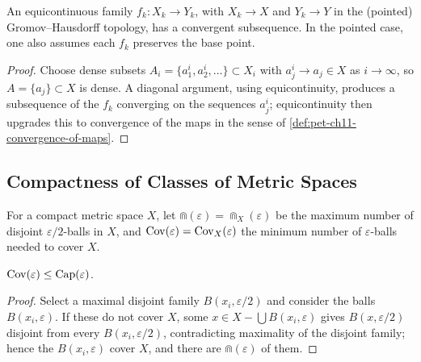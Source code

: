\begin{lemma}
  \label{lem:pet-ch11-arzela-ascoli-gh}
  An equicontinuous family $f_k:X_k\to Y_k$, with $X_k\to X$ and $Y_k\to Y$
  in the (pointed) Gromov--Hausdorff topology, has a convergent subsequence.
  In the pointed case, one also assumes each $f_k$ preserves the base point.
\end{lemma}
\begin{proof}
  Choose dense subsets $A_i=\{a_1^i,a_2^i,\dots\}\subset X_i$ with
  $a_j^i\to a_j\in X$ as $i\to\infty$, so $A=\{a_j\}\subset X$ is dense. A
  diagonal argument, using equicontinuity, produces a subsequence of the
  $f_k$ converging on the sequences $a_j^i$; equicontinuity then upgrades
  this to convergence of the maps in the sense of
  \cref{def:pet-ch11-convergence-of-maps}.
\end{proof}

\subsection{Compactness of Classes of Metric Spaces}

\begin{definition}
  \label{def:pet-ch11-capacity-covering-functions}
  For a compact metric space $X$, let
  $\Cap(\varepsilon)=\Cap_X(\varepsilon)$ be the maximum number of disjoint
  $\varepsilon/2$-balls in $X$, and $\operatorname{Cov}(\varepsilon)=\operatorname{Cov}_X(\varepsilon)$
  the minimum number of $\varepsilon$-balls needed to cover $X$.
\end{definition}

\begin{lemma}
  \label{lem:pet-ch11-cov-le-cap}
  $\operatorname{Cov}(\varepsilon)\le\operatorname{Cap}(\varepsilon)$.
\end{lemma}
\begin{proof}
  Select a maximal disjoint family $B(x_i,\varepsilon/2)$ and consider the
  balls $B(x_i,\varepsilon)$. If these do not cover $X$, some
  $x\in X-\bigcup B(x_i,\varepsilon)$ gives $B(x,\varepsilon/2)$ disjoint from
  every $B(x_i,\varepsilon/2)$, contradicting maximality of the disjoint
  family; hence the $B(x_i,\varepsilon)$ cover $X$, and there are
  $\Cap(\varepsilon)$ of them.
\end{proof}

